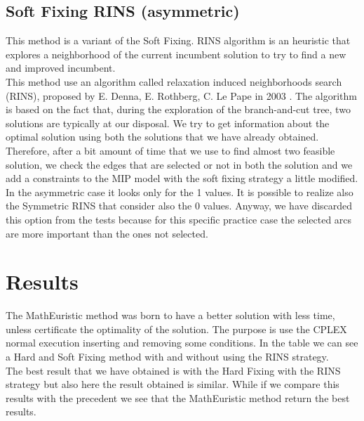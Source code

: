 \subsection{Soft Fixing RINS (asymmetric)}
This method is a variant of the Soft Fixing. RINS algorithm is an heuristic that explores a neighborhood of the current incumbent solution to try to find a new and improved incumbent.\\
This method use an algorithm called relaxation induced neighborhoods search (RINS), proposed by E. Denna, E. Rothberg, C. Le Pape in 2003 \cite{danna2005exploring}. The algorithm is based on the fact that, during the exploration of the branch-and-cut tree, two solutions are typically at our disposal. We try to get information about the optimal solution using both the solutions that we have already obtained. Therefore, after a bit amount of time that we use to find almost two feasible solution, we check the edges that are selected or not in both the solution and we add a constraints to the MIP model with the soft fixing strategy a little modified.\\
In the asymmetric case it looks only for the 1 values.
It is possible to realize also the Symmetric RINS that consider also the $0$ values. Anyway, we have discarded this option from the tests because for this specific practice case the selected arcs are more important than the ones not selected.
\section{Results}
The MathEuristic method was born to have a better solution with less time, unless certificate the optimality of the solution. The purpose is use the \textsc{CPLEX} normal execution inserting and removing some conditions. In the table we can see a Hard and Soft Fixing method with and without using the RINS strategy.\\
The best result that we have obtained is with the Hard Fixing with the RINS strategy but also here the result obtained is similar. While if we compare this results with the precedent we see that the MathEuristic method return the best results.

